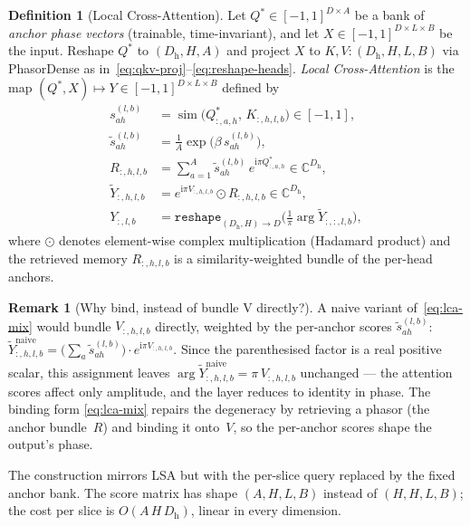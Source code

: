 \documentclass[11pt]{article}
\newcommand{\C}{\mathbb{C}}
\newcommand{\im}{\mathrm{i}}
\newcommand{\nh}{H}              %
\newcommand{\Dh}{D_{\mathrm{h}}} %
\newcommand{\sm}{\operatorname{sim}}
\theoremstyle{definition}
\newtheorem{definition}{Definition}
\newtheorem{remark}{Remark}
\begin{document}
\begin{definition}[Local Cross-Attention]\label{def:lca}
Let $Q^{*}\in[-1,1]^{D\times A}$ be a bank of \emph{anchor phase
vectors} (trainable, time-invariant), and let $X\in[-1,1]^{D\times L\times B}$
be the input. Reshape $Q^{*}$ to $(\Dh, \nh, A)$ and project $X$ to
$K, V\colon (\Dh, \nh, L, B)$ via PhasorDense as
in~\eqref{eq:qkv-proj}--\eqref{eq:reshape-heads}.
\emph{Local Cross-Attention} is the map
$(Q^{*}, X)\mapsto Y\in[-1,1]^{D\times L\times B}$ defined by
\begin{align}
  s_{a h}^{(l,b)}
    &= \sm\!\bigl(Q^{*}_{:,a,h},\, K_{:,h,l,b}\bigr)
       \in [-1,1],
       \label{eq:lca-score} \\
  \tilde s_{a h}^{(l,b)}
    &= \frac{1}{A}\exp\!\bigl(\beta\,s_{a h}^{(l,b)}\bigr),
       \label{eq:lca-scale} \\
  R_{:,h,l,b}
    &= \sum_{a=1}^{A} \tilde s_{a h}^{(l,b)}\,
       e^{\im\pi Q^{*}_{:,a,h}}
       \in \C^{\Dh},
       \label{eq:lca-retrieve} \\
  \tilde Y_{:,h,l,b}
    &= e^{\im\pi V_{:,h,l,b}} \odot R_{:,h,l,b}
       \in \C^{\Dh},
       \label{eq:lca-mix} \\
  Y_{:,l,b}
    &= \texttt{reshape}_{(\Dh,\nh)\to D}\!\bigl(
         \tfrac{1}{\pi}\arg \tilde Y_{:,:,l,b}\bigr),
       \label{eq:lca-reduce}
\end{align}
where $\odot$ denotes element-wise complex multiplication (Hadamard
product) and the retrieved memory $R_{:,h,l,b}$ is a
similarity-weighted bundle of the per-head anchors.
\end{definition}

\begin{remark}[Why bind, instead of bundle V directly?]\label{rem:lca-binding}
A naive variant of~\eqref{eq:lca-mix} would bundle
$V_{:,h,l,b}$ directly, weighted by the per-anchor scores
$\tilde s_{a h}^{(l,b)}$:
\(
  \tilde Y^{\mathrm{naive}}_{:,h,l,b}
  = \bigl(\sum_a \tilde s_{a h}^{(l,b)}\bigr)\cdot e^{\im\pi V_{:,h,l,b}}.
\)
Since the parenthesised factor is a real positive scalar, this assignment
leaves $\arg \tilde Y^{\mathrm{naive}}_{:,h,l,b} =
\pi\,V_{:,h,l,b}$ unchanged --- the attention scores affect only
amplitude, and the layer reduces to identity in phase. The binding form
\eqref{eq:lca-mix} repairs the degeneracy by retrieving a phasor (the
anchor bundle~$R$) and binding it onto~$V$, so the per-anchor scores
shape the output's phase.
\end{remark}

The construction mirrors LSA but with the per-slice query replaced by
the fixed anchor bank. The score matrix has shape
$(A, \nh, L, B)$ instead of $(\nh, \nh, L, B)$; the cost per slice is
$O(A\,\nh\,\Dh)$, linear in every dimension.
\end{document}
